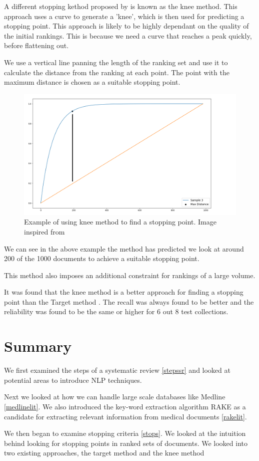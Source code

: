 A different stopping kethod proposed by \cite{Satopa11} is known as the knee method. This approach uses a curve to generate a 'knee', which is then used for predicting a stopping point. This approach is likely to be highly dependant on the quality of the initial rankings. This is because we need a curve that reaches a peak quickly, before flattening out.

We use a vertical line panning the length of the ranking set and use it to calculate the distance from the ranking at each point. The point with the maximum distance is chosen as a suitable stopping point.

\begin{figure}[H]
\center
\includegraphics[width=13cm]{figures/knee.png}
\caption{Example of using knee method to find a stopping point. Image inspired from \cite{Satopa11}}
\end{figure}

We can see in the above example the method has predicted we look at around 200 of the 1000 documents to achieve a suitable stopping point.

This method also imposes an additional constraint for rankings of a large volume. 

It was found that the knee method is a better approach for finding a stopping point than the Target method \cite{Cormack2016}. The recall was always found to be better and the reliability was found to be the same or higher for 6 out 8 test collections.

\section{Summary} \label{sumlit}

We first examined the steps of a systematic review \ref{stepssr} and looked at potential areas to introduce NLP techniques.

Next we looked at how we can handle large scale databases like Medline \ref{medlinelit}. We also introduced the key-word extraction algorithm RAKE as a candidate for extracting relevant information from medical documents \ref{rakelit}.

We then began to examine stopping criteria \ref{stops}. We looked at the intuition behind looking for stopping points in ranked sets of documents. We looked into two existing approaches, the target method and the knee method


